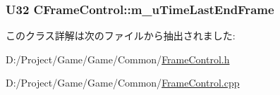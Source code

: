 \subsubsection[{m\+\_\+u\+Time\+Last\+End\+Frame}]{\setlength{\rightskip}{0pt plus 5cm}U32 C\+Frame\+Control\+::m\+\_\+u\+Time\+Last\+End\+Frame\hspace{0.3cm}{\ttfamily [private]}}\label{class_c_frame_control_a40839cdcc9ae34bfddac6a04b274d167}


このクラス詳解は次のファイルから抽出されました\+:\begin{DoxyCompactItemize}
\item 
D\+:/\+Project/\+Game/\+Game/\+Common/\hyperlink{_frame_control_8h}{Frame\+Control.\+h}\item 
D\+:/\+Project/\+Game/\+Game/\+Common/\hyperlink{_frame_control_8cpp}{Frame\+Control.\+cpp}\end{DoxyCompactItemize}
